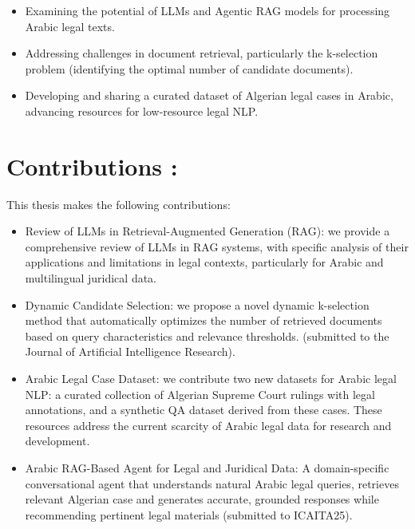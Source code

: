 \begin{itemize}
	\item Examining the potential of LLMs and Agentic RAG models for processing Arabic legal texts.
	\item Addressing challenges in document retrieval, particularly the k-selection problem (identifying the optimal number of candidate documents).
	\item Developing and sharing a curated dataset of Algerian legal cases in Arabic, advancing resources for low-resource legal NLP.
\end{itemize}
\section*{Contributions :} This thesis makes the following contributions:
    \begin{itemize}  
	\item Review of LLMs in Retrieval-Augmented Generation (RAG): we provide a comprehensive review of LLMs in RAG systems, with specific analysis of their applications and limitations in legal contexts, particularly for Arabic and multilingual juridical data.
    \item Dynamic Candidate Selection: we propose a novel dynamic k-selection method that automatically optimizes the number of retrieved documents based on query characteristics and relevance thresholds. (submitted to the Journal of Artificial Intelligence Research).
    \item Arabic Legal Case Dataset: we contribute two new datasets for Arabic legal NLP: a curated collection of Algerian Supreme Court rulings with legal annotations, and a synthetic QA dataset derived from these cases. These resources address the current scarcity of Arabic legal data for research and development.
    \item Arabic RAG-Based Agent for Legal and Juridical Data: A domain-specific conversational agent that understands natural Arabic legal queries, retrieves relevant Algerian case and generates accurate, grounded responses while recommending pertinent legal materials (submitted to ICAITA25).
  \end{itemize}
